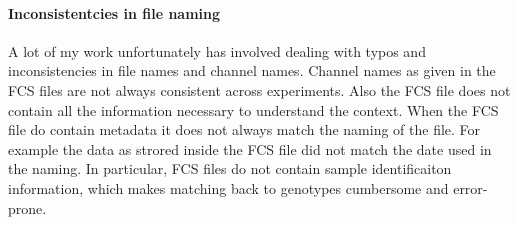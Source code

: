 \paragraph{Inconsistentcies in file naming}

A lot of my work unfortunately has involved dealing with typos and inconsistencies in file names and channel names.
Channel names as given in the FCS files are not always consistent across experiments.
Also the FCS file does not contain all the information necessary to understand the context.
When the FCS file do contain metadata it does not always match the naming of the file.
For example the data as strored inside the FCS file did not match the date used in the naming.
In particular, FCS files do not contain sample identificaiton information, which makes matching back to genotypes cumbersome and error-prone.


